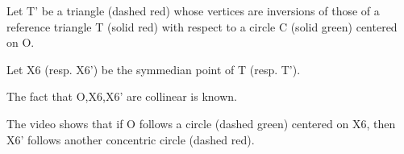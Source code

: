 Let T' be a triangle (dashed red) whose vertices are inversions of those of a reference triangle T (solid red) with respect to a circle C (solid green) centered on O.

Let X6 (resp. X6') be the symmedian point of T (resp. T').

The fact that O,X6,X6' are collinear is known.

The video shows that if O follows a circle (dashed green) centered on X6, then X6' follows another concentric circle (dashed red).